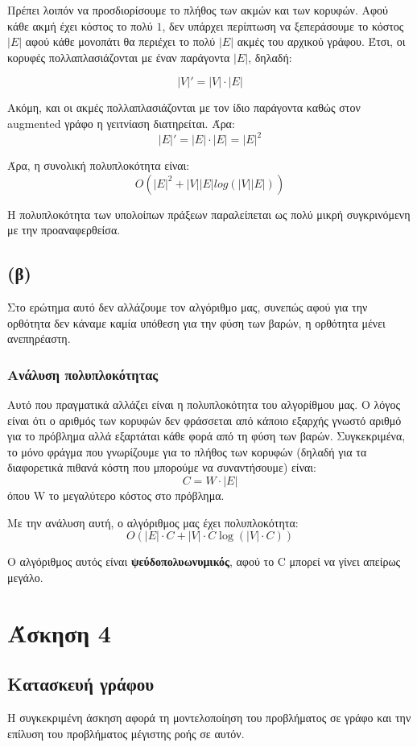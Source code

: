 \documentclass[a4paper,oneside, 11pt]{article}
\begin{document}
Πρέπει λοιπόν να προσδιορίσουμε το πλήθος των ακμών και των κορυφών. \bigbreak 
Αφού κάθε ακμή έχει κόστος το πολύ $1$, δεν υπάρχει περίπτωση να ξεπεράσουμε το κόστος $|E|$ αφού κάθε μονοπάτι θα περιέχει το πολύ $|E|$ ακμές του αρχικού γράφου. Έτσι, οι κορυφές πολλαπλασιάζονται με έναν παράγοντα $|E|$, δηλαδή:

$$
|V|' =  |V| \cdot |E|
$$

Ακόμη, και οι ακμές πολλαπλασιάζονται με τον ίδιο παράγοντα καθώς στον augmented γράφο η γειτνίαση διατηρείται. Άρα:
$$
|E|' = |E| \cdot |E| = |E|^2
$$

Άρα, η συνολική πολυπλοκότητα είναι:
$$
O(|E|^2 + |V||E|log(|V||E|) )
$$

H πολυπλοκότητα των υπολοίπων πράξεων παραλείπεται ως πολύ μικρή συγκρινόμενη με την προαναφερθείσα.
\subsection{(β)}
Στο ερώτημα αυτό δεν αλλάζουμε τον αλγόριθμο μας, συνεπώς αφού για την ορθότητα δεν κάναμε καμία υπόθεση για την φύση των βαρών, η ορθότητα μένει ανεπηρέαστη.

\subsubsection{Ανάλυση πολυπλοκότητας}
Αυτό που πραγματικά αλλάζει είναι η πολυπλοκότητα του αλγορίθμου μας. Ο λόγος είναι ότι ο αριθμός των κορυφών δεν φράσσεται από κάποιο εξαρχής γνωστό αριθμό για το πρόβλημα αλλά εξαρτάται κάθε φορά από τη φύση των βαρών. Συγκεκριμένα, το μόνο φράγμα που γνωρίζουμε για το πλήθος των κορυφών (δηλαδή για τα διαφορετικά πιθανά κόστη που μπορούμε να συναντήσουμε) είναι: 
$$
C = W \cdot |E|
$$
όπου W το μεγαλύτερο κόστος στο πρόβλημα. \bigbreak 

Με την ανάλυση αυτή, ο αλγόριθμος μας έχει πολυπλοκότητα:
$$
O(|E|\cdot C + |V|\cdot C \log(|V|\cdot C))
$$

Ο αλγόριθμος αυτός είναι \textbf{ψεύδοπολυωνυμικός}, αφού το C μπορεί να γίνει απείρως μεγάλο.
\section{Άσκηση 4}
\subsection{Κατασκευή γράφου}
Η συγκεκριμένη άσκηση αφορά τη μοντελοποίηση του προβλήματος σε γράφο και την επίλυση του προβλήματος μέγιστης ροής σε αυτόν. \bigbreak 
\end{document}
